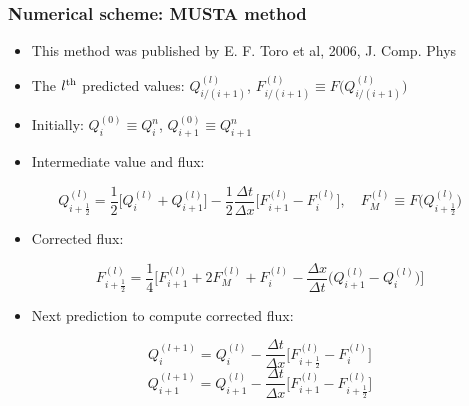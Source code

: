 \documentclass{beamer}
\begin{document}
\begin{frame}
\frametitle{Numerical scheme: MUSTA method}
\begin{itemize}
\item This method was published by E. F. Toro et al, 2006, J. Comp. Phys
\item The $l^{\rm th}$ predicted values: $Q^{(l)}_{i/(i+1)}$, $F^{(l)}_{i/(i+1)}\equiv F\big(Q^{(l)}_{i/(i+1)}\big)$
\item Initially: $Q^{(0)}_i\equiv Q^n_i$,  $Q^{(0)}_{i+1}\equiv Q^{n}_{i+1}$
\item Intermediate value and flux:
\end{itemize}
\begin{equation}
Q^{(l)}_{i+\frac{1}{2}}=\frac{1}{2}\Big[Q^{(l)}_i+Q^{(l)}_{i+1}\Big]-\frac{1}{2}\frac{\Delta t}{\Delta x}\Big[F^{(l)}_{i+1}-F^{(l)}_i\Big], \quad F_M^{(l)} \equiv F\big(Q^{(l)}_{i+\frac{1}{2}}\big)
\end{equation}


\begin{itemize}
\item Corrected flux:
\end{itemize}
\begin{equation}
F^{(l)}_{i+\frac{1}{2}}=\frac{1}{4}\Big[F^{(l)}_{i+1}+2F^{(l)}_M+F^{(l)}_{i}-\frac{\Delta x}{\Delta t}\Big(Q^{(l)}_{i+1}-Q^{(l)}_i\Big)\Big]
\end{equation}
\begin{itemize}
\item Next prediction to compute corrected flux:
\end{itemize}
\begin{equation}
Q_i^{(l+1)}=Q^{(l)}_i-\frac{\Delta t}{\Delta x}\Big[F^{(l)}_{i+\frac{1}{2}}-F^{(l)}_i\Big]
\end{equation}
\begin{equation}
Q_{i+1}^{(l+1)}=Q^{(l)}_{i+1}-\frac{\Delta t}{\Delta x}\Big[F^{(l)}_{i+1}-F^{(l)}_{i+\frac{1}{2}}\Big]
\end{equation}
\end{frame}
\end{document}
